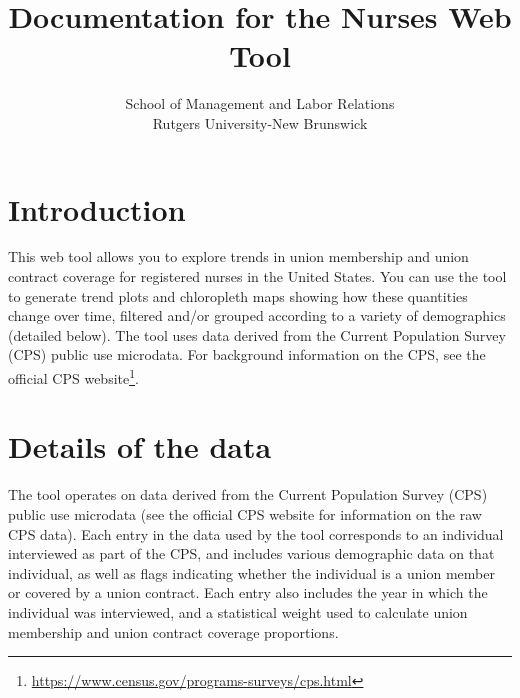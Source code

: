 \documentclass[letterpaper,12pt]{article}
\title{Documentation for the Nurses Web Tool}
\author{School of Management and Labor Relations \\
  Rutgers University-New Brunswick}
\date{}
\begin{document}
\maketitle
\tableofcontents

\section{Introduction}

This web tool allows you to explore trends in union membership and
union contract coverage for registered nurses in the United
States. You can use the tool to generate trend plots and chloropleth
maps showing how these quantities change over time, filtered and/or
grouped according to a variety of demographics (detailed below). The
tool uses data derived from the Current Population Survey (CPS) public
use microdata. For background information on the CPS, see the official
CPS website\footnote{\url{https://www.census.gov/programs-surveys/cps.html}}.

\section{Details of the data}

The tool operates on data derived from the Current Population Survey
(CPS) public use microdata (see the official CPS website for
information on the raw CPS data).  Each entry in the data used by the
tool corresponds to an individual interviewed as part of the CPS, and
includes various demographic data on that individual, as well as flags
indicating whether the individual is a union member or covered by a
union contract. Each entry also includes the year in which the
individual was interviewed, and a statistical weight used to calculate
union membership and union contract coverage proportions.
\end{document}
